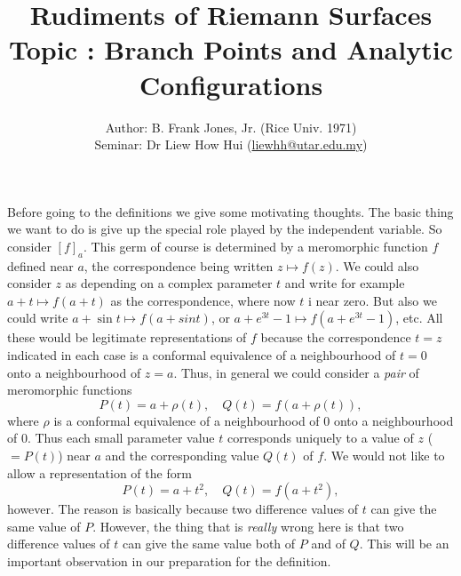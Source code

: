 \documentclass[a4paper,11pt]{article}
\newcounter{topic}
\begin{document}
\title{{\sc Rudiments of Riemann Surfaces\\
    Topic \thetopic{}: Branch Points and Analytic Configurations}}
\author{Author: B. Frank Jones, Jr. (Rice Univ. 1971)\\
Seminar: Dr Liew How Hui (\url{liewhh@utar.edu.my})}
\date{}

\maketitle

Before going to the definitions we give some motivating thoughts.  The
basic thing we want to do is give up the special role played by the
independent variable.  So consider $[f]_a$.  This germ of course is
determined by a meromorphic function $f$ defined near $a$, the
correspondence being written $z\mapsto f(z)$.  We could also consider
$z$ as depending on a complex parameter $t$ and write for example $a +
t \mapsto f(a+t)$ as the correspondence, where now $t$ i near zero.
But also we could write $a + \sin t \mapsto f(a+sin t)$, or $a +
e^{3t}-1 \mapsto f(a+e^{3t}-1)$, etc.  All these would be legitimate
representations of $f$ because the correspondence $t = z$
indicated in each case is a conformal equivalence of a neighbourhood
of $t = 0$ onto a neighbourhood of $z = a$.  Thus, in general we could
consider a \emph{pair} of meromorphic functions
$$
P(t) = a + \rho(t),\quad Q(t) = f(a + \rho(t)),
$$
where $\rho$ is a conformal equivalence of a neighbourhood of 0 onto a
neighbourhood of 0.  Thus each small parameter value $t$ corresponds
uniquely to a value of $z$ ($= P(t)$) near $a$ and the corresponding
value $Q(t)$ of $f$.  We would not like to allow a representation of
the form
$$
P(t) = a + t^2,\quad Q(t) = f(a + t^2),
$$
however.  The reason is basically because two difference values of $t$
can give the same value of $P$.  However, the thing that is
\emph{really} wrong here is that two difference values of $t$ can give
the same value both of $P$ and of $Q$.  This will be an important
observation in our preparation for the definition.
\end{document}

